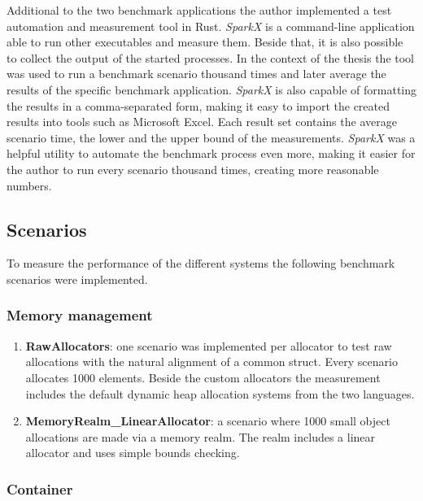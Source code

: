\noindent

Additional to the two benchmark applications the author implemented a test automation and measurement tool in Rust. \textit{SparkX} is a command-line application able to run other executables and measure them. Beside that, it is also possible to collect the output of the started processes. In the context of the thesis the tool was used to run a benchmark scenario thousand times and later average the results of the specific benchmark application. \textit{SparkX} is also capable of formatting the results in a comma-separated form, making it easy to import the created results into tools such as Microsoft Excel. Each result set contains the average scenario time, the lower and the upper bound of the measurements. \textit{SparkX} was a helpful utility to automate the benchmark process even more, making it easier for the author to run every scenario thousand times, creating more reasonable numbers.

\subsection{Scenarios}

To measure the performance of the different systems the following benchmark scenarios were implemented. 

\subsubsection{Memory management}

\begin{enumerate}
	\item \textbf{RawAllocators}: one scenario was implemented per allocator to test raw allocations with the natural alignment of a common struct. Every scenario allocates 1000 elements. Beside the custom allocators the measurement includes the default dynamic heap allocation systems from the two languages.
	
	\item \textbf{MemoryRealm\_LinearAllocator}: a scenario where 1000 small object allocations are made via a memory realm. The realm includes a linear allocator and uses simple bounds checking.
\end{enumerate}

\subsubsection{Container}

